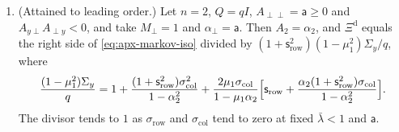 \begin{theorem}
\begin{enumerate}
\begin{equation}
\end{equation}
and if in addition $\bar\lambda+\varrho_\perp<1$, then $\Xi^{\mathrm d}\le\frac{16}3M_\perp^2\sigma_{\mathrm{col}}(\sigma_{\mathrm{col}}+\sigma_{\mathrm{row}})\mathsf{gap}_\perp^{-2}(1-\bar\lambda)/(1-\hat\alpha_\perp)$.
\item[(d)] (Attained to leading order.) Let $n=2$, $Q=qI$, $A_{\perp\perp}=\mathsf a\ge0$ and $A_{y\perp}A_{\perp y}<0$, and take $M_\perp=1$ and $\alpha_\perp=\mathsf a$. Then $A_2=\alpha_2$, and $\Xi^{\mathrm d}$ equals the right side of \eqref{eq:apx-markov-iso} divided by $(1+\mathsf s_{\mathrm{row}}^2)(1-\mu_1^2)\Sigma_y/q$, where
\begin{equation*}
\frac{(1-\mu_1^2)\Sigma_y}q=1+\frac{(1+\mathsf s_{\mathrm{row}}^2)\sigma_{\mathrm{col}}^2}{1-\alpha_2^2}+\frac{2\mu_1\sigma_{\mathrm{col}}}{1-\mu_1\alpha_2}\Bigl[\mathsf s_{\mathrm{row}}+\frac{\alpha_2(1+\mathsf s_{\mathrm{row}}^2)\sigma_{\mathrm{col}}}{1-\alpha_2^2}\Bigr].
\end{equation*}
The divisor tends to $1$ as $\sigma_{\mathrm{row}}$ and $\sigma_{\mathrm{col}}$ tend to zero at fixed $\bar\lambda<1$ and $\mathsf a$.
\end{enumerate}
\end{theorem}

